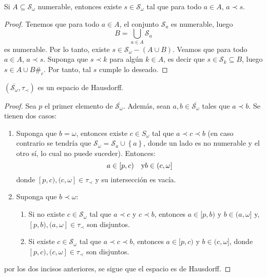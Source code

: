 \documentclass[12pt]{report}
\theoremstyle{largebreak}
\newcommand\contradiction{\ensuremath{\#_c}}
\newcommand{\Cls}[1]{\ensuremath{\overline{#1}}}
\begin{document}
    \begin{propo}
        Si $A\subseteq \mathcal{S}_\omega$ numerable, entonces existe $s\in\mathcal{S}_\omega$ tal que para todo $a\in A$, $a\prec s$.
    \end{propo}

    \begin{proof}
        Tenemos que para todo $a\in A$, el conjunto $\mathcal{S}_a$ es numerable, luego
        \begin{equation*}
            B=\bigcup_{ a\in A}\mathcal{S}_a
        \end{equation*}
        es numerable. Por lo tanto, existe $s\in\mathcal{S}_\omega-(A\cup B)$. Veamos que para todo $a\in A$, $a\prec s$. Suponga que $s\prec k$ para algún $k\in A$, es decir que $s\in \mathcal{S}_k\subseteq B$, luego $s\in A\cup B$\contradiction. Por tanto, tal $s$ cumple lo deseado.
    \end{proof}

    \begin{propo}
        $(\Cls{\mathcal{S}_\omega},\tau_\prec)$ es un espacio de Hausdorff.
    \end{propo}

    \begin{proof}
        Sea $p$ el primer elemento de $\Cls{\mathcal{S}_\omega}$. Además, sean $a,b\in\Cls{\mathcal{S}_\omega}$ tales que $a\prec b$. Se tienen dos casos:
        \begin{enumerate}
            \item Suponga que $b=\omega$, entonces existe $c\in S_\omega$ tal que $a\prec c\prec b$ (en caso contrario se tendría que $\mathcal{S}_\omega=\mathcal{S}_a\cup\left\{a\right\}$, donde un lado es no numerable y el otro sí, lo cual no puede suceder). Entonces:
            \begin{equation*}
                a\in [p,c)\quad\textup{y}b\in(c,\omega]
            \end{equation*}
            donde $[p,c),(c,\omega]\in\tau_\prec$ y su intersección es vacía.
            \item Suponga que $b\prec\omega$:
            \begin{enumerate}
                \item Si no existe $c\in\mathcal{S}_\omega$ tal que $a\prec c$ y $c\prec b$, entonces $a\in [p,b)$ y $b\in (a,\omega]$ y, $[p,b),(a,\omega]\in\tau_\prec$ son disjuntos.
                \item Si existe $c\in\mathcal{S}_\omega$ tal que $a\prec c\prec b$, entonces $a\in [p,c)$ y $b\in (c,\omega]$, donde $[p,c),(c,\omega]\in\tau_\prec$ son disjuntos.
            \end{enumerate}
        \end{enumerate}
        por los dos incisos anteriores, se sigue que el espacio es de Hausdorff.
    \end{proof}
\end{document}
